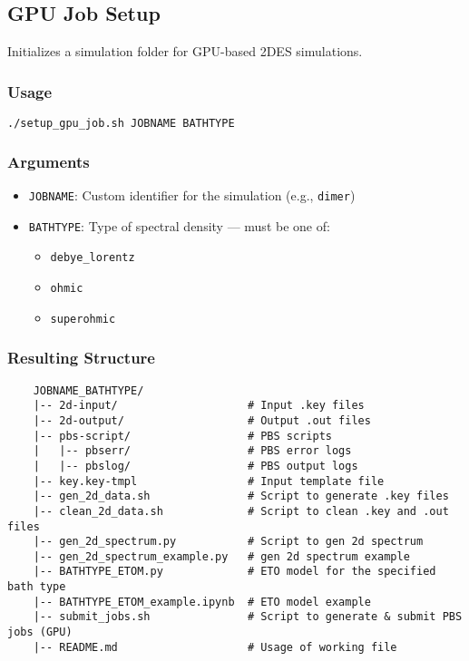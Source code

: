 \documentclass{article}
\begin{document}
\subsection{GPU Job Setup}

Initializes a simulation folder for GPU-based 2DES simulations.

\subsubsection*{Usage}
\begin{lstlisting}[language=bash]
./setup_gpu_job.sh JOBNAME BATHTYPE
\end{lstlisting}

\subsubsection*{Arguments}
\begin{itemize}
    \item \texttt{JOBNAME}: Custom identifier for the simulation (e.g., \texttt{dimer})
    \item \texttt{BATHTYPE}: Type of spectral density — must be one of:
    \begin{itemize}
        \item \texttt{debye\_lorentz}
        \item \texttt{ohmic}
        \item \texttt{superohmic}
    \end{itemize}
\end{itemize}

\subsubsection*{Resulting Structure}
\begin{verbatim}
    JOBNAME_BATHTYPE/
    |-- 2d-input/                    # Input .key files
    |-- 2d-output/                   # Output .out files
    |-- pbs-script/                  # PBS scripts
    |   |-- pbserr/                  # PBS error logs
    |   |-- pbslog/                  # PBS output logs
    |-- key.key-tmpl                 # Input template file
    |-- gen_2d_data.sh               # Script to generate .key files
    |-- clean_2d_data.sh             # Script to clean .key and .out files
    |-- gen_2d_spectrum.py           # Script to gen 2d spectrum
    |-- gen_2d_spectrum_example.py   # gen 2d spectrum example
    |-- BATHTYPE_ETOM.py             # ETO model for the specified bath type
    |-- BATHTYPE_ETOM_example.ipynb  # ETO model example
    |-- submit_jobs.sh               # Script to generate & submit PBS jobs (GPU)
    |-- README.md                    # Usage of working file
\end{verbatim}
\end{document}
